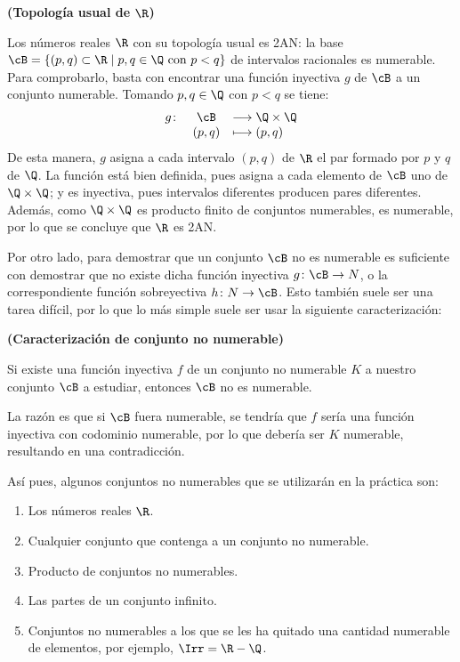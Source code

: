 \begin{ej}
    {\bf (Topología usual de $\R$)} 
    \item Los números reales $\R$ con su topología usual es 2AN: la base $\cB = \{(p,q) \subset \R \mid p,q \in \Q \text{ con } p < q\}$ de intervalos racionales es numerable. Para comprobarlo, basta con encontrar una función inyectiva $g$ de $\cB$ a un conjunto numerable. Tomando $p,q \in \Q$ con $p < q$ se tiene:
    \[
    \begin{array}{rcl}
        g \colon & \cB  & \longrightarrow \Q \times \Q \\
                & (p,q) & \longmapsto     (p,q)
    \end{array}
    \]
    De esta manera, $g$ asigna a cada intervalo $(p,q)$ de $\R$ el par formado por $p$ y $q$ de $\Q$. La función está bien definida, pues asigna a cada elemento de $\cB$ uno de $\Q \times \Q$; y es inyectiva, pues intervalos diferentes producen pares diferentes. Además, como $\Q \times \Q$ es producto finito de conjuntos numerables, es numerable, por lo que se concluye que $\R$ es 2AN.
\end{ej}

Por otro lado, para demostrar que un conjunto $\cB$ no es numerable es suficiente con demostrar que no existe dicha función inyectiva $g\colon \cB \to N$, o la correspondiente función sobreyectiva $h\colon N \to \cB$. Esto también suele ser una tarea difícil, por lo que lo más simple suele ser usar la siguiente caracterización:
\begin{prop}
    {\bf (Caracterización de conjunto no numerable)}
    \item Si existe una función inyectiva $f$ de un conjunto no numerable $K$ a nuestro conjunto $\cB$ a estudiar, entonces $\cB$ no es numerable.
    \item La razón es que si $\cB$ fuera numerable, se tendría que $f$ sería una función inyectiva con codominio numerable, por lo que debería ser $K$ numerable, resultando en una contradicción.
\end{prop}

Así pues, algunos conjuntos no numerables que se utilizarán en la práctica son:
\begin{enumerate}[label=--, itemsep=0pt]
    \item Los números reales $\R$.
    \item Cualquier conjunto que contenga a un conjunto no numerable.
    \item Producto de conjuntos no numerables.
    \item Las partes de un conjunto infinito.
    \item Conjuntos no numerables a los que se les ha quitado una cantidad numerable de elementos, por ejemplo, $\Irr = \R - \Q$.
\end{enumerate}

